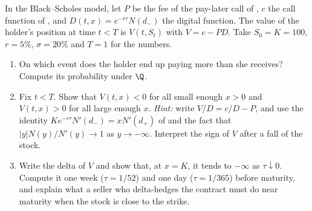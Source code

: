 \begin{exercise}\label{ex:fk-pay-later}
\medium In the Black--Scholes model, let $P$ be the fee of the pay-later call of
, $c$ the call function of , and
$D(t,x)=e^{-r\tau}N(d_-)$ the digital function. The value of the holder's position at time $t<T$ is
$V(t,S_t)$ with $V=c-PD$. Take $S_0=K=100$, $r=5\%$, $\sigma=20\%$ and $T=1$ for the numbers.
\begin{enumerate}[label=(\alph*)]
  \item On which event does the holder end up paying more than she receives? Compute its
    probability under $\Q$.
  \item Fix $t<T$. Show that $V(t,x)<0$ for all small enough $x>0$ and $V(t,x)>0$ for all large
    enough $x$. \emph{Hint:} write $V/D=c/D-P$, and use the identity $Ke^{-r\tau}N'(d_-)=xN'(d_+)$ of
     and the fact that $|y|N(y)/N'(y)\to1$ as $y\to-\infty$. Interpret the sign of $V$ after a fall of the stock.
  \item Write the delta of $V$ and show that, at $x=K$, it tends to $-\infty$ as $\tau\downarrow0$.
    Compute it one week ($\tau=1/52$) and one day ($\tau=1/365$) before maturity, and explain what a
    seller who delta-hedges the contract must do near maturity when the stock is close to the
    strike.
\end{enumerate}
\end{exercise}

